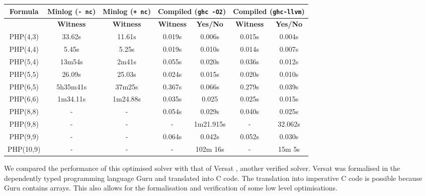 \documentclass{article}
\begin{document}
\begin{center}
{\small
\begin{tabular}{|c||c|c||c|c||c|c|}
  \hline
  \textbf{Formula} & \textbf{Minlog (\texttt{- nc})}  & \textbf{Minlog (\texttt{+ nc})} & \multicolumn{2}{|c|}{\textbf{Compiled (\texttt{ghc -O2})}} & \multicolumn{2}{|c|}{\textbf{Compiled (\texttt{ghc-llvm})}} \\ \hline 
  & \textbf{Witness} & \textbf{Witness} &  \textbf{Witness} & \textbf{Yes/No} & \textbf{Witness} & \textbf{Yes/No} \\ \hline
  PHP(4,3) & 33.62s & 11.61s    & 0.019s   & 0.006s  & 0.015s & 0.004s  \\ \hline
  PHP(4,4) &  5.45s  &   5.25s      &  0.019s   & 0.010s & 0.014s & 0.007s   \\ \hline
  PHP(5,4) &  13m54s      &  2m41s   & 0.055s   &  0.020s & 0.036s & 0.012s  \\ \hline
  PHP(5,5) & 26.09s &  25.03s    &  0.024s   &  0.015s & 0.020s & 0.010s \\ \hline
  PHP(6,5) & 5h35m41s & 37m25s  &  0.367s  & 0.066s & 0.279s & 0.039s \\ \hline
  PHP(6,6) &    1m34.11s    &  1m24.88s    &  0.035s  & 0.025 & 0.025s & 0.015s    \\ \hline \hline
  PHP(8,8) &   - & - & 0.054s & 0.029s & 0.040s & 0.025s \\ \hline
  PHP(9,8) &   - & - & -  & 1m21.915s & - & 32.062s  \\ \hline
  PHP(9,9) &   - & - &  0.064s & 0.042s & 0.052s & 0.030s \\ \hline
  PHP(10,9) &   - & - & - & 102m 16s  & - & 15m 5s \\ \hline
\end{tabular}
}
\end{center}
%
\medskip
 We compared the performance of this optimised solver with that of Versat \cite{DO12}, another verified solver. Versat was formalised in the dependently typed programming language Guru \cite{AS09} and translated into C code. The translation into imperative C code is possible because Guru contains arrays. This also allows for the formalisation and verification of some low level optimisations.  \medskip
\end{document}
